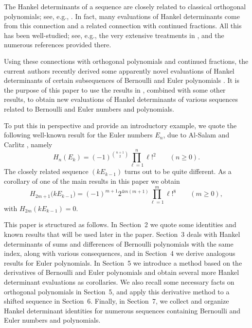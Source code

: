 \documentclass{amsart}
\theoremstyle{plain}
\numberwithin{equation}{section}
\begin{document}
The Hankel determinants of a sequence are closely related to classical 
orthogonal polynomials; see, e.g., \cite[Ch.~2]{Is}. In fact, many evaluations
of Hankel determinants come from this connection and a related connection with
continued fractions. All this has been well-studied; see, e.g., the very
extensive treatments in \cite{Kr, Kr2, Mi}, and the numerous references
provided there.

Using these connections with orthogonal polynomials and continued fractions,
the current authors recently derived some apparently novel evaluations of 
Hankel determinants of certain subsequences of Bernoulli and Euler polynomials
\cite{DJ}. It is the purpose of this paper to use the results in \cite{DJ},
combined with some other results, to obtain new evaluations of Hankel
determinants of various sequences related to Bernoulli and Euler numbers and
polynomials.

To put this in perspective and provide an introductory example, we quote the
following well-known result for the Euler numbers $E_n$, due to Al-Salam and 
Carlitz \cite[Eq.~(4.2)]{AC}, namely
\begin{equation}\label{1.4}
H_n(E_k) = (-1)^{\binom{n+1}{2}}\prod_{\ell=1}^n\ell!^2\qquad
(n\geq 0).
\end{equation}
The closely related sequence $(kE_{k-1})$ turns out to be quite different.
As a corollary of one of the main results in this paper we obtain
\begin{equation}\label{1.5}
H_{2m+1}\big(kE_{k-1}\big) 
= (-1)^{m+1}2^{4m(m+1)}\prod_{\ell=1}^m\ell!^{8}\qquad(m\geq 0),
\end{equation}
with $H_{2m}(kE_{k-1})=0$.

This paper is structured as follows. In Section~2 we quote some 
identities and known results that will be used later in the paper. Section~3
deals with Hankel determinants of sums and differences of Bernoulli polynomials
with the same index, along with various consequences, and in Section~4 we 
derive analogous results for Euler polynomials. In Section~5 we introduce a
method based on the derivatives of Bernoulli and Euler polynomials and obtain
several more Hankel determinant evaluations as corollaries. We also recall some
necessary facts on orthogonal polynomials in Section~5, and apply this 
derivative method to a shifted sequence in Section~6. Finally, in Section~7,
we collect and organize Hankel determinant identities for numerous sequences
containing Bernoulli and Euler numbers and polynomials.
\end{document}
